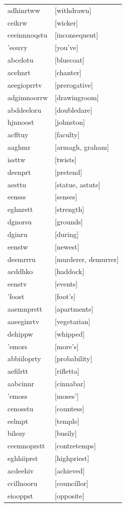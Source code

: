 \documentclass{article}
\begin{document}
\begin{tabular}{ll}
adhinrtww & [withdrawn] \\
ceikrw & [wicker] \\
ceeinnnoqstu & [inconsequent] \\
'eouvy & [you've] \\
abcelotu & [bluecoat] \\
acehnrt & [chanter] \\
aeegioprrtv & [prerogative] \\
adgimnoorrw & [drawingroom] \\
abddeeloru & [doubledare] \\
hjnnoost & [johnston] \\
acfltuy & [faculty] \\
aaghmr & [armagh, graham] \\
issttw & [twists] \\
deenprt & [pretend] \\
aesttu & [statue, astute] \\
eensss & [senses] \\
eghnrstt & [strength] \\
dgnorsu & [grounds] \\
dginru & [during] \\
eenstw & [newest] \\
deemrrru & [murderer, demurrer] \\
acddhko & [haddock] \\
eenstv & [events] \\
'foost & [foot's] \\
aaemnprstt & [apartments] \\
aaeeginrtv & [vegetarian] \\
dehippw & [whipped] \\
'emors & [more's] \\
abbiiloprty & [probability] \\
aefilrtt & [rifletta] \\
aabcinnr & [cinnabar] \\
'emoss & [moses'] \\
cenosstu & [countess] \\
eelmpt & [temple] \\
bilsuy & [busily] \\
ceemnoprstt & [contretemps] \\
eghhiiprst & [highpriest] \\
acdeehiv & [achieved] \\
ccillnooru & [councillor] \\
eiooppst & [opposite] \\

\end{tabular}
\end{document}
